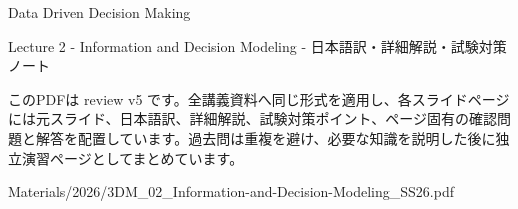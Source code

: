 \documentclass[a4paper,landscape,9pt]{article}
\begin{document}
\begin{titlepage}
\centering
\vspace*{2cm}
{\Huge Data Driven Decision Making\par}
\vspace{0.5cm}
{\Large Lecture 2 - Information and Decision Modeling - 日本語訳・詳細解説・試験対策ノート\par}
\vspace{1cm}
\begin{minipage}{0.82\textwidth}
このPDFは review v5 です。全講義資料へ同じ形式を適用し、各スライドページには元スライド、日本語訳、詳細解説、試験対策ポイント、ページ固有の確認問題と解答を配置しています。過去問は重複を避け、必要な知識を説明した後に独立演習ページとしてまとめています。
\end{minipage}
\vfill
{\large Materials/2026/3DM\_02\_Information-and-Decision-Modeling\_SS26.pdf}
\end{titlepage}
\tableofcontents
\clearpage

\end{document}
